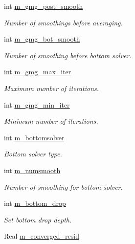 \begin{DoxyCompactItemize}
int \hyperlink{classpoisson__multifluid__gmg_ad81b89116e64878e9c01423b9c3718e7}{m\+\_\+gmg\+\_\+post\+\_\+smooth}
\begin{DoxyCompactList}\small\item\em Number of smoothings before averaging. \end{DoxyCompactList}\item 
int \hyperlink{classpoisson__multifluid__gmg_abe063a69192d156c3d865eaaf7b1f1dd}{m\+\_\+gmg\+\_\+bot\+\_\+smooth}
\begin{DoxyCompactList}\small\item\em Number of smoothing before bottom solver. \end{DoxyCompactList}\item 
int \hyperlink{classpoisson__multifluid__gmg_a6c5032bbfc64b6244999d8da8e221cbc}{m\+\_\+gmg\+\_\+max\+\_\+iter}
\begin{DoxyCompactList}\small\item\em Maximum number of iterations. \end{DoxyCompactList}\item 
int \hyperlink{classpoisson__multifluid__gmg_afbd5549164a894e68cd4355111b95b1e}{m\+\_\+gmg\+\_\+min\+\_\+iter}
\begin{DoxyCompactList}\small\item\em Minimum number of iterations. \end{DoxyCompactList}\item 
int \hyperlink{classpoisson__multifluid__gmg_ab847ca230bc714ae3bca57d7ee8435ed}{m\+\_\+bottomsolver}
\begin{DoxyCompactList}\small\item\em Bottom solver type. \end{DoxyCompactList}\item 
int \hyperlink{classpoisson__multifluid__gmg_ab50737e41af7f1f7de3646530ca7ea24}{m\+\_\+numsmooth}
\begin{DoxyCompactList}\small\item\em Number of smoothing for bottom solver. \end{DoxyCompactList}\item 
int \hyperlink{classpoisson__multifluid__gmg_ae0cc80d0227f14a3e15e7799f349b2ac}{m\+\_\+bottom\+\_\+drop}
\begin{DoxyCompactList}\small\item\em Set bottom drop depth. \end{DoxyCompactList}\item 
Real \hyperlink{classpoisson__multifluid__gmg_aa018c7cf22076e64f4a89ba76c8c545c}{m\+\_\+converged\+\_\+resid}

\end{DoxyCompactItemize}
